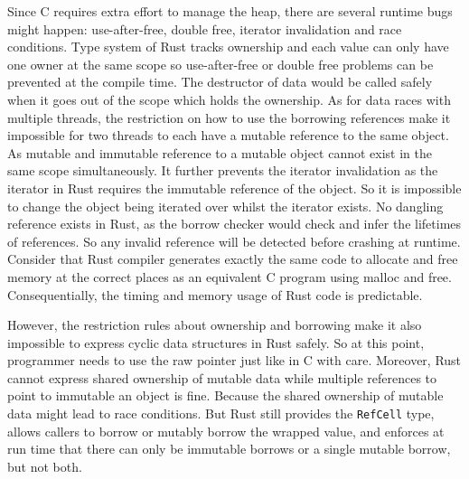 \documentclass[10pt,a4paper,twocolumn]{article}
\newcommand{\code}[1]{\colorbox{light-gray}{\texttt{#1}}}
\begin{document}
Since C requires extra effort to manage the heap, there are several runtime bugs might happen: use-after-free, double free, iterator invalidation and race conditions. Type system of Rust tracks ownership and each value can only have one owner at the same scope so use-after-free or double free problems can be prevented at the compile time. The destructor of data would be called safely when it goes out of the scope which holds the ownership. As for data races with multiple threads, the restriction on how to use the borrowing references make it impossible for two threads to each have a mutable reference to the same object. As mutable and immutable reference to a mutable object cannot exist in the same scope simultaneously. It further prevents the iterator invalidation as the iterator in Rust requires the immutable reference of the object. So it is impossible to change the object being iterated over whilst the iterator exists. No dangling reference exists in Rust, as the borrow checker would check and infer the lifetimes of references. So any invalid reference will be detected before crashing at runtime.  Consider that Rust compiler generates exactly the same code to allocate and free memory at the correct places as an equivalent C program using malloc and free. Consequentially, the timing and memory usage of Rust code is predictable.

However, the restriction rules about ownership and borrowing make it also impossible to express cyclic data structures in Rust safely. So at this point, programmer needs to use the raw pointer just like in C with care. Moreover, Rust cannot express shared ownership of mutable data while multiple references to point to immutable an object is fine. Because the shared ownership of mutable data might lead to race conditions. But Rust still provides the \code{RefCell} type, allows callers to borrow or mutably borrow the wrapped value, and enforces at run time that there can only be immutable borrows or a single mutable borrow, but not both.


\end{document}
